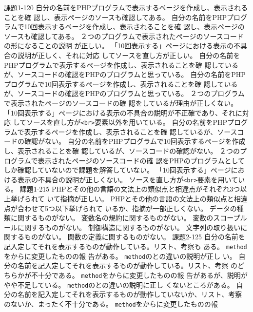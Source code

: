 \documentclass[a4j]{jreport}
\begin{document}
{
{課題1-1}{20}
{
  {自分の名前をPHPプログラムで表示するページを作成し、表示されることを確
	認し、表示ページのソースも確認してある。}
  {自分の名前をPHPプログラムで10回表示するページを作成し、表示されることを確
	認し、表示ページのソースも確認してある。}
	{２つのプログラムで表示されたページのソースコードの形になることの説明
	が正しい。}
	{「10回表示する」ページにおける表示の不具合の説明が正しく、それに対応
	してソースを直し方が正しい。}
}
{
  {自分の名前をPHPプログラムで表示するページを作成し、表示されることを確
	認しているが、ソースコードの確認をPHPのプログラムと思っている。}
  {自分の名前をPHPプログラムで10回表示するページを作成し、表示されることを確
	認しているが、ソースコードの確認をPHPのプログラムと思っている。}
	{２つのプログラムで表示されたページのソースコードの確
	 認をしているが理由が正しくない。}
	{「10回表示する」ページにおける表示の不具合の説明が不正確であり、それに対応
	してソースを直し方が\texttt{<br>}要素以外を用いている。}
}
{
  {自分の名前をPHPプログラムで表示するページを作成し、表示されることを確
	認しているが、ソースコードの確認がない。}
  {自分の名前をPHPプログラムで10回表示するページを作成し、表示されることを確
	認しているが、ソースコードの確認がない。}
	{２つのプログラムで表示されたページのソースコードの確
	 認をPHPのプログラムとしてしか確認していないので課題を解答していない。}
	{「10回表示する」ページにおける表示の不具合の説明が正しくない。
	ソースを直し方が\texttt{<br>}要素を用いている。}
}
{\ResultA}
{課題1-2}{15}
{
  {PHPとその他の言語の文法上の類似点と相違点がそれぞれ3つ以上挙げられて
	いて指摘が正しい。}
}
{
  {PHPとその他の言語の文法上の類似点と相違点が合わせて5つ以下挙げられて
	いるか、指摘が一部正しくない。}
}
{
	{データの種類に関するものがない。}
  {変数名の規約に関するものがない。}
	{変数のスコープルールに関するものがない。}
	{制御構造に関するものがない。}
	{文字列の取り扱いに関するものがない。}
	{関数の定義に関するものがない。}
}
{\ResultEI}
{課題2-1}{25}
{
  {自分の名前を記入定してそれを表示するものが動作している。リスト、考察も
	ある。}
	{\texttt{method}をからに変更したものの報
	告がある。}
	{\texttt{method}のとの違いの説明が正し
	い。}
}
{
  {自分の名前を記入定してそれを表示するものが動作している。リスト、考察
	のどちらかが不十分である。}
	{\texttt{method}をからに変更したものの報
	告があるが、説明がやや不足している。}
	{\texttt{method}のとの違いの説明に正し
	くないところがある。}
}
{
  {自分の名前を記入定してそれを表示するものが動作していないか、リスト、考察
	のないか、まったく不十分である。}
	{\texttt{method}をからに変更したものの報
}}}
\end{document}
